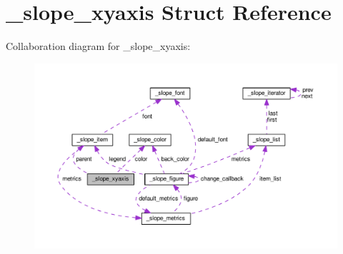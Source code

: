 \hypertarget{struct__slope__xyaxis}{\section{\+\_\+slope\+\_\+xyaxis Struct Reference}
\label{struct__slope__xyaxis}
}


Collaboration diagram for \+\_\+slope\+\_\+xyaxis\+:
\nopagebreak
\begin{figure}[H]
\begin{center}
\leavevmode
\includegraphics[width=350pt]{struct__slope__xyaxis__coll__graph}
\end{center}
\end{figure}
